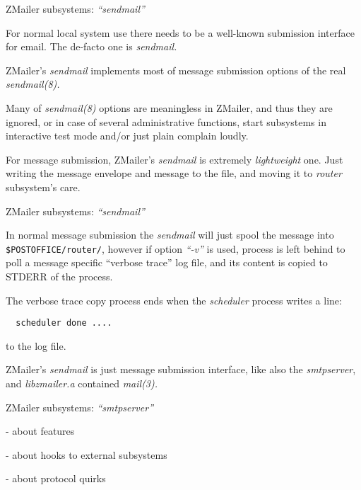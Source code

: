 \documentclass[a4paper,landscape]{slides}
\newcommand{\ZM}{ZMailer}
\begin{document}
\begin{slide}

\centerline{\large \ZM{} subsystems: {\em ``sendmail''}}

For normal local system use there needs to be a well-known
submission interface for email.  The de-facto one is {\em sendmail.}

\ZM's {\em sendmail} implements most of message submission options
of the real {\em sendmail(8).}

Many of {\em sendmail(8)} options are meaningless in \ZM{}, and thus
they are ignored, or in case of several administrative functions,
start subsystems in interactive test mode and/or just plain complain
loudly.

For message submission, \ZM's {\em sendmail} is extremely
{\em lightweight} one.  Just writing the message envelope and
message to the file, and moving it to {\em router} subsystem's care.


\vfill

\end{slide}

\begin{slide}

\centerline{\large \ZM{} subsystems: {\em ``sendmail''}}

In normal message submission the {\em sendmail} will just spool
the message into \verb!$POSTOFFICE/router/!, however if option
{\em ``-v''} is used, process is left behind to poll a message
specific ``verbose trace'' log file, and its content is copied
to STDERR of the process.

The verbose trace copy process ends when the {\em scheduler}
process writes a line:
\begin{verbatim}
  scheduler done ....
\end{verbatim}
to the log file.

\ZM's {\em sendmail} is just message submission interface, like
also the {\em smtpserver}, and  {\em libzmailer.a}  contained
{\em mail(3).}

\vfill

\end{slide}


\begin{slide}
\centerline{\large \ZM{} subsystems: {\em ``smtpserver''}}

- about features

- about hooks to external subsystems

- about protocol quirks

\vfill
\end{slide}
\end{document}
